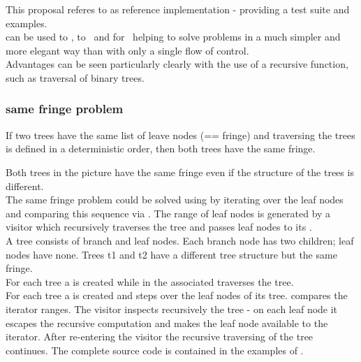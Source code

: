 
This proposal referes to \boostcoroutine as reference implementation - providing
a test suite and examples.\\
\newline
\coro can be used to \escrecloops, to \escreccomps~and for \coopmultitasking~helping
to solve problems in a much simpler and more elegant way than with only a single
flow of control.\\
Advantages can be seen particularly clearly with the use of a recursive function,
such as traversal of binary trees.

\subsubsection*{same fringe problem}

If two trees have the same list of leave nodes (== fringe) and traversing the
trees is defined in a deterministic order, then both trees have the same fringe.\\


Both trees in the picture have the same fringe even if the structure of the trees
is different.\\
\newline
The same fringe problem could be solved using \coro by iterating over the leaf
nodes and comparing this sequence via . The range of leaf
nodes is generated by a visitor which recursively traverses the tree and passes
leaf nodes to its \coro.\\
\newline
{}
A tree consists of branch and leaf nodes. Each branch node has two children; leaf
nodes have none. Trees t1 and t2 have a different tree structure but the same fringe.\\
For each tree a \coro is created while in the associated \corofunction {}
traverses the tree.\\
For each tree a \coro is created and \coroiterator steps over the leaf nodes of
its tree.  compares the iterator ranges.
\newline
{}
The visitor inspects recursively the tree - on each leaf node it escapes the recursive
computation and makes the leaf node available to the iterator. After re-entering the
visitor the recursive traversing of the tree continues.
\newline
The complete source code is contained in the examples of \boostcoroutine.
